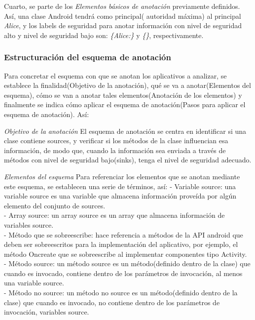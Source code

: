 Cuarto, se parte de los \textit{Elementos básicos de anotación} previamente
definidos. Así, una clase Android tendrá como principal( autoridad máxima) al
principal \emph{Alice}, y los labels de seguridad para anotar información con
nivel de seguridad alto y nivel de seguridad bajo son: \emph{\{Alice:\}} y
\emph{\{\}}, respectivamente.

\subsubsection{Estructuración del esquema de anotación}
Para concretar el esquema con que se anotan los aplicativos a analizar, se
establece la finalidad(Objetivo de la anotación), qué se va a anotar(Elementos
del esquema), cómo se van a anotar tales elementos(Anotación de los elementos) y
finalmente se indica cómo aplicar el esquema de anotación(Pasos para aplicar el
esquema de anotación). Así:

\textit{Objetivo de la anotación}\newline
El esquema de anotación se centra en identificar si una clase contiene sources,
y verificar si los métodos de la clase influencian esa información, de modo que,
cuando la información sea enviada a través de métodos con nivel de seguridad
bajo(sinks), tenga el nivel de seguridad adecuado.

\textit{Elementos del esquema}\newline
Para referenciar los elementos que se anotan mediante este esquema, se
establecen una serie de términos, así:\newline
- Variable source: una variable source es una variable que almacena
información proveída por algún elemento del conjunto de sources.\\
- Array source: un array source es un array que almacena información de
variables source.\\
- Método que se sobreescribe: hace referencia a métodos de la API android
que deben ser sobreescritos para la implementación del aplicativo, por ejemplo, el
método Oncreate que se sobreescribe al implementar componentes tipo
Activity.\\
- Método source: un método source es un método(definido dentro de la
clase) que cuando es invocado, contiene dentro de los parámetros de invocación, al menos
una variable source.\\
- Método no source: un método no source es un método(definido dentro de la
clase) que cuando es invocado, no contiene dentro de los parámetros de invocación,
variables source.

